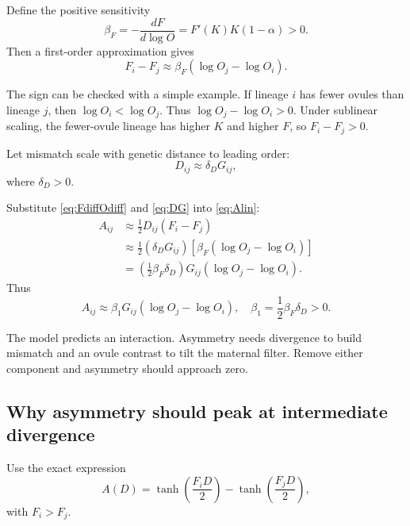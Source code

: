 \documentclass[12pt]{article}
\begin{document}
Define the positive sensitivity
\begin{equation}
\beta_F=-\frac{dF}{d\log O}=F'(K)K(1-\alpha)>0.
\label{eq:betaF}
\end{equation}
Then a first-order approximation gives
\begin{equation}
F_i-F_j\approx \beta_F(\log O_j-\log O_i).
\label{eq:FdiffOdiff}
\end{equation}

\begin{rulebox}
The sign can be checked with a simple example. If lineage $i$ has fewer ovules than lineage $j$, then $\log O_i<\log O_j$. Thus $\log O_j-\log O_i>0$. Under sublinear scaling, the fewer-ovule lineage has higher $K$ and higher $F$, so $F_i-F_j>0$.
\end{rulebox}

Let mismatch scale with genetic distance to leading order:
\begin{equation}
D_{ij}\approx \delta_DG_{ij},
\label{eq:DG}
\end{equation}
where $\delta_D>0$.

Substitute \eqref{eq:FdiffOdiff} and \eqref{eq:DG} into \eqref{eq:Alin}:
\begin{align}
A_{ij}
&\approx \frac{1}{2}D_{ij}(F_i-F_j) \\
&\approx \frac{1}{2}(\delta_DG_{ij})\left[\beta_F(\log O_j-\log O_i)\right] \\
&=\left(\frac{1}{2}\beta_F\delta_D\right)G_{ij}(\log O_j-\log O_i).
\end{align}
Thus
\begin{equation}
\boxed{A_{ij}\approx \beta_1G_{ij}(\log O_j-\log O_i),
\quad \beta_1=\frac{1}{2}\beta_F\delta_D>0.}
\label{eq:Aint}
\end{equation}

\begin{conclusionbox}
The model predicts an interaction. Asymmetry needs divergence to build mismatch and an ovule contrast to tilt the maternal filter. Remove either component and asymmetry should approach zero.
\end{conclusionbox}

\subsection{Why asymmetry should peak at intermediate divergence}

Use the exact expression
\begin{equation}
A(D)=\tanh\left(\frac{F_iD}{2}\right)-\tanh\left(\frac{F_jD}{2}\right),
\end{equation}
with $F_i>F_j$.
\end{document}
